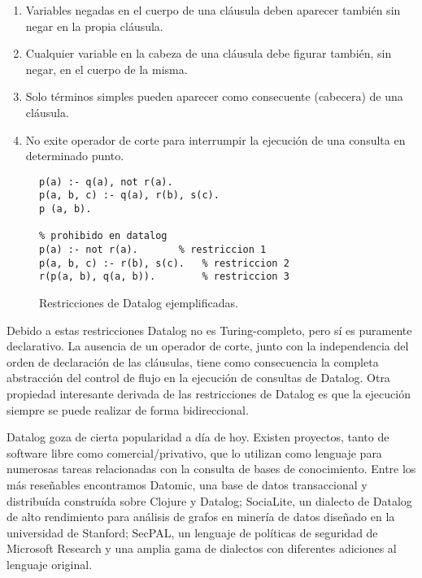 \documentclass[11pt,captions=nooneline,DIV=14, parskip=full]{scrartcl}
\begin{document}
\begin{enumerate}
\item Variables negadas en el cuerpo de una cláusula deben aparecer también sin negar en la propia cláusula.
\item Cualquier variable en la cabeza de una cláusula debe figurar también, sin negar, en el cuerpo de la misma.
\item Solo términos simples pueden aparecer como consecuente (cabecera) de una cláusula.
\item No exite operador de corte para interrumpir la ejecución de una consulta en determinado punto.
\end{enumerate}

\begin{figure}[!htbp]
\lstset{language=Prolog}
\begin{lstlisting}[frame=single]
% permitido en datalog
p(a) :- q(a), not r(a).
p(a, b, c) :- q(a), r(b), s(c).
p (a, b).

% prohibido en datalog
p(a) :- not r(a).		% restriccion 1
p(a, b, c) :- r(b), s(c).	% restriccion 2
r(p(a, b), q(a, b)).		% restriccion 3

\end{lstlisting} 
\caption{Restricciones de Datalog ejemplificadas.}
\label{fig:restriccionesdatalog}
\end{figure}

Debido a estas restricciones Datalog no es Turing-completo, pero sí es puramente declarativo. La ausencia de un operador de corte, junto con la independencia del orden de declaración de las cláusulas, tiene como consecuencia la completa abstracción del control de flujo en la ejecución de consultas de Datalog. Otra propiedad interesante derivada de las restricciones de Datalog es que la ejecución siempre se puede realizar de forma bidireccional.

Datalog goza de cierta popularidad a día de hoy. Existen proyectos, tanto de software libre como comercial/privativo, que lo utilizan como lenguaje para numerosas tareas relacionadas con la consulta de bases de conocimiento. Entre los más reseñables encontramos Datomic, una base de datos transaccional y distribuída construída sobre Clojure y Datalog; SociaLite, un dialecto de Datalog de alto rendimiento para análisis de grafos en minería de datos diseñado en la universidad de Stanford; SecPAL, un lenguaje de políticas de seguridad de Microsoft Research y una amplia gama de dialectos con diferentes adiciones al lenguaje original.
\end{document}

